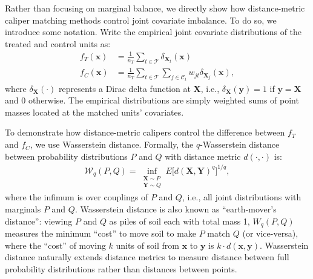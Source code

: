 \documentclass{article}
\newcommand{\bX}{\mathbf{X}}
\newcommand{\Xt}{\mathbf{X}_t}
\newcommand{\Xj}{\mathbf{X}_j}
\newcommand{\Ct}{\mathcal{C}_{t}}
\newcommand{\ind}[1]{\mathds{1} \{ #1 \} }
\begin{document}
Rather than focusing on marginal balance, we directly show how distance-metric caliper matching methods control joint covariate imbalance.
To do so, we introduce some notation.
Write the empirical joint covariate distributions of the treated and control units as:
\begin{align*}
    f_T(\mathbf{x}) 
    &= \frac{1}{n_T} \sum_{t \in \mathcal{T}} \delta_{\Xt}(\mathbf{x}) \\
    f_C(\mathbf{x}) 
    &= \frac{1}{n_T} \sum_{t \in \mathcal{T}} \sum_{j \in \Ct} w_{jt} \delta_{\Xj} (\mathbf{x}),
\end{align*}
where $\delta_{\bX}(\cdot)$ represents a Dirac delta function at $\bX$, i.e., $\delta_{\bX}(\mathbf{y}) = 1$ if $\mathbf{y} = \mathbf{X}$ and $0$ otherwise.
The empirical distributions are simply weighted sums of point masses located at the matched units' covariates.

To demonstrate how distance-metric calipers control the difference between $f_T$ and $f_C$, we use Wasserstein distance.
Formally, the $q$-Wasserstein distance between probability distributions $P$ and $Q$ with distance metric $d(\cdot, \cdot)$ is:
\begin{align*}
    \mathcal{W}_q(P, Q) = \inf_{\substack{\bX \sim P \\ \mathbf{Y} \sim Q}} E\big[ d(\bX, \mathbf{Y})^q \big]^{1/q},
\end{align*}
where the infimum is over couplings of $P$ and $Q$, i.e., all joint distributions with marginals $P$ and $Q$.
Wasserstein distance is also known as ``earth-mover's distance'':
viewing $P$ and $Q$ as piles of soil each with total mass 1, $W_q(P, Q)$ measures the minimum ``cost'' to move soil to make $P$ match $Q$ (or vice-versa), where the ``cost'' of moving $k$ units of soil from $\mathbf{x}$ to $\mathbf{y}$ is $k\cdot d(\mathbf{x}, \mathbf{y})$.
Wasserstein distance naturally extends distance metrics to measure distance between full probability distributions rather than distances between points.
\end{document}
